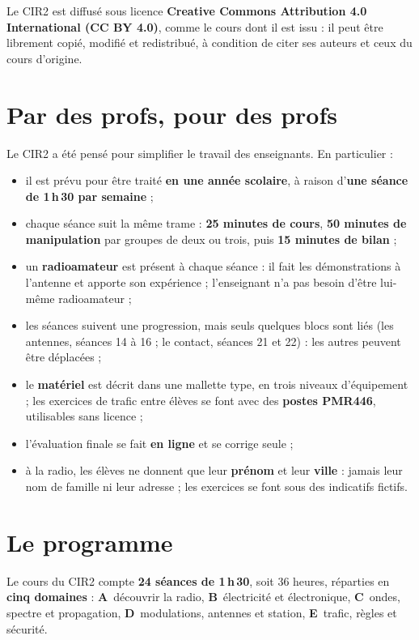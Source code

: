 \documentclass[11pt,a4paper]{article}
\begin{document}
Le CIR2 est diffusé sous licence \textbf{Creative Commons Attribution 4.0
International (CC BY 4.0)}, comme le cours dont il est issu : il peut être
librement copié, modifié et redistribué, à condition de citer ses auteurs et
ceux du cours d'origine.

\section{Par des profs, pour des profs}

Le CIR2 a été pensé pour simplifier le travail des enseignants. En particulier :
\begin{itemize}
  \item il est prévu pour être traité \textbf{en une année scolaire}, à raison
    d'\textbf{une séance de 1\,h\,30 par semaine} ;
  \item chaque séance suit la même trame : \textbf{25 minutes de cours},
    \textbf{50 minutes de manipulation} par groupes de deux ou trois, puis
    \textbf{15 minutes de bilan} ;
  \item un \textbf{radioamateur} est présent à chaque séance : il fait les
    démonstrations à l'antenne et apporte son expérience ; l'enseignant n'a
    pas besoin d'être lui-même radioamateur ;
  \item les séances suivent une progression, mais seuls quelques blocs sont
    liés (les antennes, séances 14 à 16 ; le contact, séances 21 et 22) : les
    autres peuvent être déplacées ;
  \item le \textbf{matériel} est décrit dans une mallette type, en trois
    niveaux d'équipement ; les exercices de trafic entre élèves se font avec
    des \textbf{postes PMR446}, utilisables sans licence ;
  \item l'évaluation finale se fait \textbf{en ligne} et se corrige seule ;
  \item à la radio, les élèves ne donnent que leur \textbf{prénom} et leur
    \textbf{ville} : jamais leur nom de famille ni leur adresse ; les exercices
    se font sous des indicatifs fictifs.
\end{itemize}

\section{Le programme}

Le cours du CIR2 compte \textbf{24 séances de 1\,h\,30}, soit 36 heures,
réparties en \textbf{cinq domaines} : \textbf{A}~découvrir la radio,
\textbf{B}~électricité et électronique, \textbf{C}~ondes, spectre et
propagation, \textbf{D}~modulations, antennes et station, \textbf{E}~trafic,
règles et sécurité.
\end{document}
